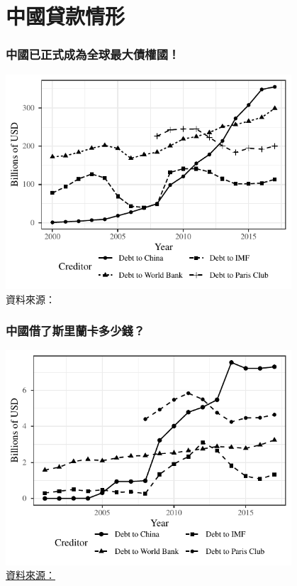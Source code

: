 \documentclass[mathserif]{beamer}
\begin{document}
    \section{中國貸款情形}

    \begin{frame}
        \frametitle{中國已正式成為全球最大債權國！}
        \centering
        \includegraphics[width = 0.8\textwidth]{fig/aggr_debt_source.pdf}\\
        \small 資料來源：\citet*{Horn-Reinhart-Trebesch-21}
    \end{frame}

    \begin{frame}[label = {sri_ts}]
        \frametitle{中國借了斯里蘭卡多少錢？}
        \begin{center}
            \includegraphics[width = 0.8\textwidth]{fig/ALL/Sri Lanka_debt_source.pdf}\\
            \small \hyperlink{sri_ds<2>}{資料來源：}\citet*{Horn-Reinhart-Trebesch-21}
        \end{center}
    \end{frame}
\end{document}
